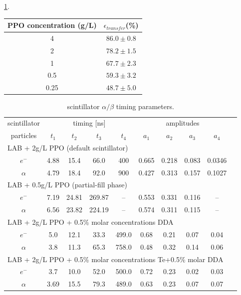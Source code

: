 \ref{transfer_efficiency}\cite{collaboration2020development}. 

\begin{table}[ht]
	\centering
	\begin{tabular}{cc}
		\toprule
		PPO concentration (g/L) & $\mathcal{\epsilon}_{transfer}$(\%)	\\
		\midrule
		4   & $86.0\pm 0.8$\\
		2  & $78.2\pm 1.5$\\
		1  & $67.7\pm 2.3$\\
		0.5 & $59.3\pm 3.2$\\
		0.25 & $48.7\pm 5.0$\\
		\bottomrule
	\end{tabular}
	\label{transfer_efficiency}
\end{table}


\begin{table}[ht]
	\caption[]{scintillator $\alpha/\beta$ timing parameters\cite{tanner0p5,joshW1,chicagoTiming}.}	\label{scint_timing} 
	\centering
	\begin{tabular*}{165mm}{c@{\extracolsep{\fill}}*9c}
		\toprule 
		\multicolumn{1}{c}{scintillator} & \multicolumn{4}{c}{timing [ns]} & \multicolumn{4}{c}{amplitudes}\\
		\cline{0-1}\cline{2-5} \cline{6-9}		
		particles      & $t_1$ & $t_2$ & $t_3$ & $t_4$ & $a_1$ &$a_2$ &$a_3$&$a_4$\\
		\midrule
		\multicolumn{9}{l}{LAB + 2g/L PPO (default scintillator)}\\
		$e^-$ & 4.88 & 15.4 & 66.0 & 400 & 0.665 & 0.218 & 0.083& 0.0346\\	
		$\alpha$ & 4.79 & 18.4 & 92.0 & 900 & 0.427 & 0.313 & 0.157 & 0.1027\\
		\hline
		\multicolumn{9}{l}{LAB + 0.5g/L PPO (partial-fill phase)} \\
		$e^-$& 7.19 & 24.81 & 269.87 & -- &0.553 &0.331 &0.116 & --\\
		$\alpha$& 6.56 &23.82 &224.19&--& 0.574&0.311& 0.115&--\\
		\hline
		\multicolumn{9}{l}{LAB + 2g/L PPO + 0.5\% molar concentrations DDA} \\
		$e^-$ & 5.0& 12.1& 33.3& 499.0& 0.68& 0.21& 0.07& 0.04\\
		$\alpha$ &3.8 &11.3& 65.3& 758.0& 0.48& 0.32& 0.14& 0.06 \\
		\hline
		\multicolumn{9}{l}{LAB + 2g/L PPO + 0.5\% molar concentrations Te+0.5\% molar DDA}\\
		$e^-$ & 3.7 & 10.0 & 52.0  & 500.0 & 0.72 & 0.23 & 0.02 &0.03\\
		$\alpha$ & 3.69 & 15.5 & 79.3  & 489.0 & 0.63 & 0.23 & 0.07 &0.07\\	
		\bottomrule	
	\end{tabular*}
\end{table}

